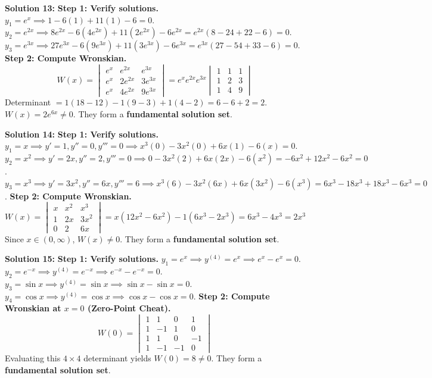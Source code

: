 \documentclass[12pt]{article}
\begin{document}
\textbf{Solution 13:}
\textbf{Step 1: Verify solutions.}
$y_1=e^x \implies 1 - 6(1) + 11(1) - 6 = 0$.
$y_2=e^{2x} \implies 8e^{2x} - 6(4e^{2x}) + 11(2e^{2x}) - 6e^{2x} = e^{2x}(8 - 24 + 22 - 6) = 0$.
$y_3=e^{3x} \implies 27e^{3x} - 6(9e^{3x}) + 11(3e^{3x}) - 6e^{3x} = e^{3x}(27 - 54 + 33 - 6) = 0$.
\textbf{Step 2: Compute Wronskian.}
$$W(x) = \begin{vmatrix} e^x & e^{2x} & e^{3x} \\ e^x & 2e^{2x} & 3e^{3x} \\ e^x & 4e^{2x} & 9e^{3x} \end{vmatrix} = e^x e^{2x} e^{3x} \begin{vmatrix} 1 & 1 & 1 \\ 1 & 2 & 3 \\ 1 & 4 & 9 \end{vmatrix}$$
Determinant $= 1(18-12) - 1(9-3) + 1(4-2) = 6 - 6 + 2 = 2$.
$W(x) = 2e^{6x} \neq 0$. They form a \textbf{fundamental solution set}.

\textbf{Solution 14:}
\textbf{Step 1: Verify solutions.}
$y_1=x \implies y'=1, y''=0, y'''=0 \implies x^3(0) - 3x^2(0) + 6x(1) - 6(x) = 0$.
$y_2=x^2 \implies y'=2x, y''=2, y'''=0 \implies 0 - 3x^2(2) + 6x(2x) - 6(x^2) = -6x^2 + 12x^2 - 6x^2 = 0$.
$y_3=x^3 \implies y'=3x^2, y''=6x, y'''=6 \implies x^3(6) - 3x^2(6x) + 6x(3x^2) - 6(x^3) = 6x^3 - 18x^3 + 18x^3 - 6x^3 = 0$.
\textbf{Step 2: Compute Wronskian.}
$$W(x) = \begin{vmatrix} x & x^2 & x^3 \\ 1 & 2x & 3x^2 \\ 0 & 2 & 6x \end{vmatrix} = x(12x^2 - 6x^2) - 1(6x^3 - 2x^3) = 6x^3 - 4x^3 = 2x^3$$
Since $x \in (0, \infty)$, $W(x) \neq 0$. They form a \textbf{fundamental solution set}.

\textbf{Solution 15:}
\textbf{Step 1: Verify solutions.}
$y_1=e^x \implies y^{(4)}=e^x \implies e^x-e^x=0$.
$y_2=e^{-x} \implies y^{(4)}=e^{-x} \implies e^{-x}-e^{-x}=0$.
$y_3=\sin x \implies y^{(4)}=\sin x \implies \sin x-\sin x=0$.
$y_4=\cos x \implies y^{(4)}=\cos x \implies \cos x-\cos x=0$.
\textbf{Step 2: Compute Wronskian at $x=0$ (Zero-Point Cheat).}
$$W(0) = \begin{vmatrix} 1 & 1 & 0 & 1 \\ 1 & -1 & 1 & 0 \\ 1 & 1 & 0 & -1 \\ 1 & -1 & -1 & 0 \end{vmatrix}$$
Evaluating this $4 \times 4$ determinant yields $W(0) = 8 \neq 0$. They form a \textbf{fundamental solution set}.
\end{document}
